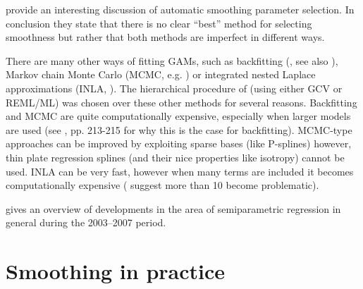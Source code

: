  provide an interesting discussion of automatic smoothing parameter selection. In conclusion they state that there is no clear ``best'' method for selecting smoothness but rather that both methods are imperfect in different ways. 




There are many other ways of fitting GAMs, such as backfitting (, see also ), Markov chain Monte Carlo (MCMC, e.g. ) or integrated nested Laplace approximations (INLA, ). The hierarchical procedure of  (using either GCV or REML/ML) was chosen over these other methods for several reasons. Backfitting and MCMC are quite computationally expensive, especially when larger models are used (see , pp. 213-215 for why this is the case for backfitting). MCMC-type approaches can be improved by exploiting sparse bases (like P-splines) however, thin plate regression splines (and their nice properties like isotropy) cannot be used. INLA can be very fast, however when many terms are included it becomes computationally expensive ( suggest more than 10 become problematic).

 gives an overview of developments in the area of semiparametric regression in general during the 2003--2007 period.

\section{Smoothing in practice}
\label{intro-inpractice}

